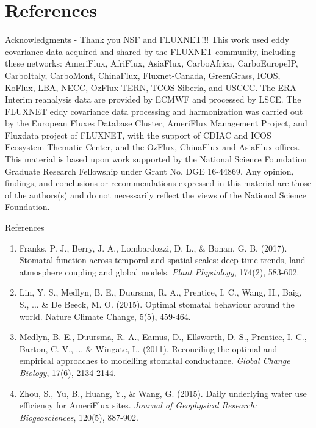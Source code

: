 \documentclass[aspectratio=169]{beamer}
\begin{document}
\section{References}
\begin{frame}{Acknowledgments - Thank you NSF and FLUXNET!!!}
  This work used eddy covariance data acquired and shared by the FLUXNET community, including these networks: AmeriFlux, AfriFlux, AsiaFlux, CarboAfrica, CarboEuropeIP, CarboItaly, CarboMont, ChinaFlux, Fluxnet-Canada, GreenGrass, ICOS, KoFlux, LBA, NECC, OzFlux-TERN, TCOS-Siberia, and USCCC. The ERA-Interim reanalysis data are provided by ECMWF and processed by LSCE. The FLUXNET eddy covariance data processing and harmonization was carried out by the European Fluxes Database Cluster, AmeriFlux Management Project, and Fluxdata project of FLUXNET, with the support of CDIAC and ICOS Ecosystem Thematic Center, and the OzFlux, ChinaFlux and AsiaFlux offices.\\
  \medskip
  This material is based upon work supported by the National Science Foundation Graduate Research Fellowship under Grant No. DGE 16-44869. Any opinion, findings, and conclusions or recommendations expressed in this material are those of the authors(s) and do not necessarily reflect the views of the National Science Foundation.
\end{frame}

\begin{frame}{References}
  \begin{enumerate}
  \item Franks, P. J., Berry, J. A., Lombardozzi, D. L., \& Bonan, G. B. (2017). Stomatal function across temporal and spatial scales: deep-time trends, land-atmosphere coupling and global models. \textit{Plant Physiology}, 174(2), 583-602.
  \item Lin, Y. S., Medlyn, B. E., Duursma, R. A., Prentice, I. C., Wang, H., Baig, S., ... \& De Beeck, M. O. (2015). Optimal stomatal behaviour around the world. Nature Climate Change, 5(5), 459-464.
  \item Medlyn, B. E., Duursma, R. A., Eamus, D., Ellsworth, D. S., Prentice, I. C., Barton, C. V., ... \& Wingate, L. (2011). Reconciling the optimal and empirical approaches to modelling stomatal conductance. \textit{Global Change Biology}, 17(6), 2134-2144.
  \item Zhou, S., Yu, B., Huang, Y., \& Wang, G. (2015). Daily underlying water use efficiency for AmeriFlux sites. \textit{Journal of Geophysical Research: Biogeosciences}, 120(5), 887-902.
  \end{enumerate}
\end{frame}
\end{document}
